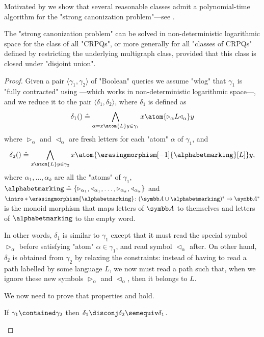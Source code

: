 Motivated by 
we show that several reasonable classes admit
a polynomial-time algorithm for the "strong canonization problem"---see
.

\begin{lemma}
	\AP\label{lem:canonization-CRPQs}
	The "strong canonization problem" can be solved in non-deterministic logarithmic space for the class of all
	"CRPQs", or more generally for all "classes of CRPQs" defined by restricting the
	underlying multigraph class, provided that this class is closed under "disjoint union".
\end{lemma}

\begin{proof}
	Given a pair $\langle\gamma_1, \gamma_2\rangle$ of "Boolean" queries
	we assume "wlog" that $\gamma_1$ is "fully contracted" using
	---which works in non-deterministic logarithmic space---,
	and we reduce it to the pair $\langle \delta_1, \delta_2 \rangle$,
	where $\delta_1$ is defined as
	\[
		\delta_1() \defeq \bigwedge_{\alpha = x \atom{L} y \in \gamma_1} x \atom{\triangleright_\alpha L \triangleleft_\alpha} y
	\]
	where $\triangleright_\alpha$ and $\triangleleft_\alpha$ are fresh letters for each "atom" $\alpha$ of $\gamma_1$,
	and 
	\[
		\delta_2() \defeq \bigwedge_{x \atom{L} y \in \gamma_2} x \atom{\erasingmorphism[-1]{\alphabetmarking}[L]} y,
	\]
	where $\alpha_1, \dotsc, \alpha_k$ are all the "atoms" of $\gamma_1$,
	$\alphabetmarking \defeq \{\triangleright_{\alpha_1},\triangleleft_{\alpha_1}, \dotsc,
	\triangleright_{\alpha_k}, \triangleleft_{\alpha_k}\}$ and
	\AP$\intro*\erasingmorphism{\alphabetmarking}\colon (\A\cup \alphabetmarking)^* \to \A^*$
	is the monoid morphism that maps letters of $\A$ to themselves and 
	letters of $\alphabetmarking$ to the empty word.

	In other words, $\delta_1$ is similar to $\gamma_1$ except that it must read the special
	symbol $\triangleright_{\alpha}$ before satisfying "atom" $\alpha \in \gamma_1$,
	and read symbol $\triangleleft_{\alpha}$ after.
	On other hand, $\delta_2$ is obtained from $\gamma_2$ by relaxing the constraints:
	instead of having to read a path labelled by some language $L$,
	we now must read a path such that, when we ignore these new symbols $\triangleright_{\alpha}$
	and $\triangleleft_{\alpha}$, then it belongs to $L$.

	We now need to prove that properties \axiomsCanon{} and \axiomStrongCanonCore{} hold.
	\begin{claim}
		\AP\label{claim:canonization-multigraph-monotonic-l-to-r}
		If $\gamma_1 \contained \gamma_2$ then $\delta_1 \disconj \delta_2 \semequiv \delta_1$.
	\end{claim}
		

\end{proof}
